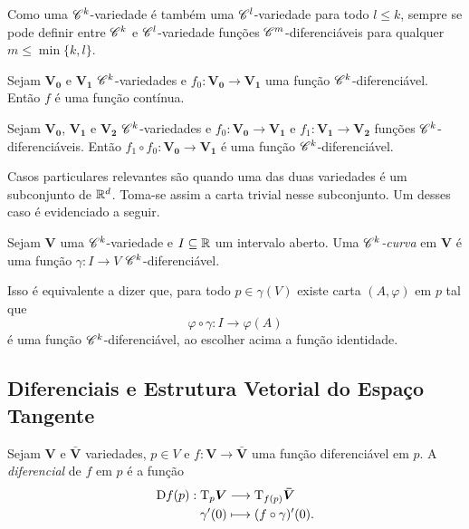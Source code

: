 Como uma $\mathscr{C}^k$-variedade é também uma $\mathscr{C}^l$-variedade para todo $l\leq k$, sempre se pode definir entre $\mathscr{C}^k$ e $\mathscr{C}^l$-variedade funções $\mathscr{C}^m$-diferenciáveis para qualquer $m \leq \min\{k,l\}$.

\begin{prop}
Sejam $\bm{V_0}$ e $\bm{V_1}$ $\mathscr{C}^k$-variedades e $f_0: \bm{V_0} \to \bm{V_1}$ uma função $\mathscr{C}^k$-diferenciável. Então $f$ é uma função contínua.
\end{prop}

\begin{prop}
Sejam $\bm{V_0}$, $\bm{V_1}$ e $\bm{V_2}$ $\mathscr{C}^k$-variedades e $f_0: \bm{V_0} \to \bm{V_1}$ e $f_1: \bm{V_1} \to \bm{V_2}$ funções $\mathscr{C}^k$-diferenciáveis. Então $f_1 \circ f_0: \bm{V_0} \to \bm{V_1}$ é uma função $\mathscr{C}^k$-diferenciável.
\end{prop}

Casos particulares relevantes são quando uma das duas variedades é um subconjunto de $\mathbb{R}^d$. Toma-se assim a carta trivial nesse subconjunto. Um desses caso é evidenciado a seguir.

\begin{defi}
Sejam $\bm V$ uma $\mathscr{C}^k$-variedade e $I \subseteq \mathbb{R}$ um intervalo aberto. Uma \emph{$\mathscr{C}^k$-curva} em $\bm V$ é uma função $\gamma: I \to V$ $\mathscr{C}^k$-diferenciável.
\end{defi}

Isso é equivalente a dizer que, para todo $p \in \gamma(V)$ existe carta $(A,\varphi)$ em $p$ tal que
	\begin{equation*}
	\varphi \circ \gamma: I \to \varphi(A)
	\end{equation*}
é uma função $\mathscr{C}^k$-diferenciável, ao escolher acima a função identidade.

\subsection{Diferenciais e Estrutura Vetorial do Espaço Tangente}

\begin{defi}
Sejam $\bm V$ e $\bm{\bar V}$ variedades, $p \in V$ e $f: \bm V \to \bm{\bar V}$ uma função diferenciável em $p$. A \emph{diferencial} de $f$ em $p$ é a função
	\begin{align*}
	{\mathrm{D}f(p)}: {\mathrm{T}_p\bm V} &\longrightarrow {\mathrm{T}_{f(p)}\bm{\bar V}} \\{\gamma'(0)} &\longmapsto {(f \circ \gamma)'(0)}.
	\end{align*}
\end{defi}

